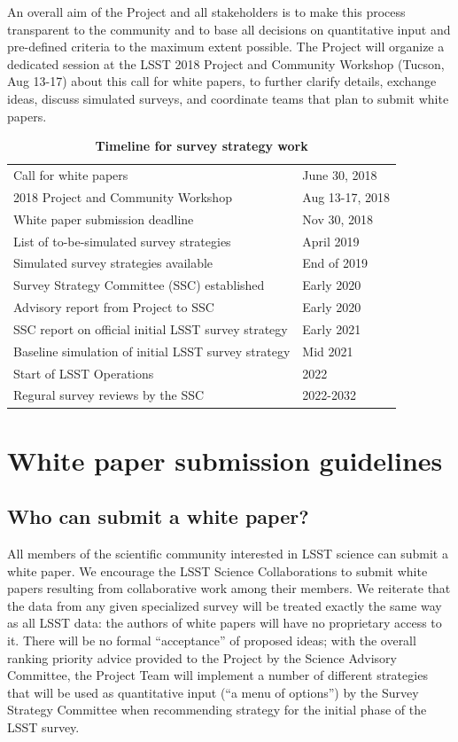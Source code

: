 \documentclass[DM,lsstdraft,toc,usenatbib]{lsstdoc}
\begin{document}
An overall aim of the Project and all stakeholders is to make this process transparent to the community and to base 
all decisions on quantitative input and pre-defined criteria to the maximum extent possible. 
The Project will organize a dedicated session at the LSST 2018 Project and Community Workshop (Tucson, Aug 13-17)
about this call for white papers, to further clarify  details, exchange ideas, discuss simulated surveys, 
and coordinate teams that plan to submit white papers. 

\begin{table}[htp]
\caption{\bf{Timeline for survey strategy work}}
\begin{center}
\begin{tabular}{l|l}
Call for white papers & June 30, 2018 \\
2018 Project and Community Workshop & Aug 13-17, 2018 \\
White paper submission deadline & Nov 30, 2018 \\
List of to-be-simulated survey strategies & April 2019 \\
Simulated survey strategies available & End of 2019 \\
Survey Strategy Committee (SSC) established & Early 2020 \\
Advisory report from Project to SSC & Early 2020 \\
SSC report on official initial LSST survey strategy & Early 2021 \\
Baseline simulation of initial LSST survey strategy & Mid 2021 \\
Start of LSST Operations & 2022 \\
Regural survey reviews by the SSC & 2022-2032 \\
\end{tabular}
\end{center}
\end{table}


\section{White paper submission guidelines} 


\subsection{Who can submit a white paper?} 

All members of the scientific community interested in LSST science can submit a white paper. 
We encourage the LSST Science Collaborations to submit white papers resulting from collaborative
work among their members.
We reiterate that the data from any given specialized survey will be treated exactly the same 
way as all LSST data: the authors of white papers will have no proprietary access to it. There will be no 
formal ``acceptance'' of proposed ideas; with the overall ranking priority advice provided to the 
Project by the Science Advisory Committee, the Project Team will implement a number of
different strategies that will be used as quantitative input (``a menu of options'') by the 
Survey Strategy Committee when recommending strategy for the initial phase of the LSST survey. 
\end{document}
